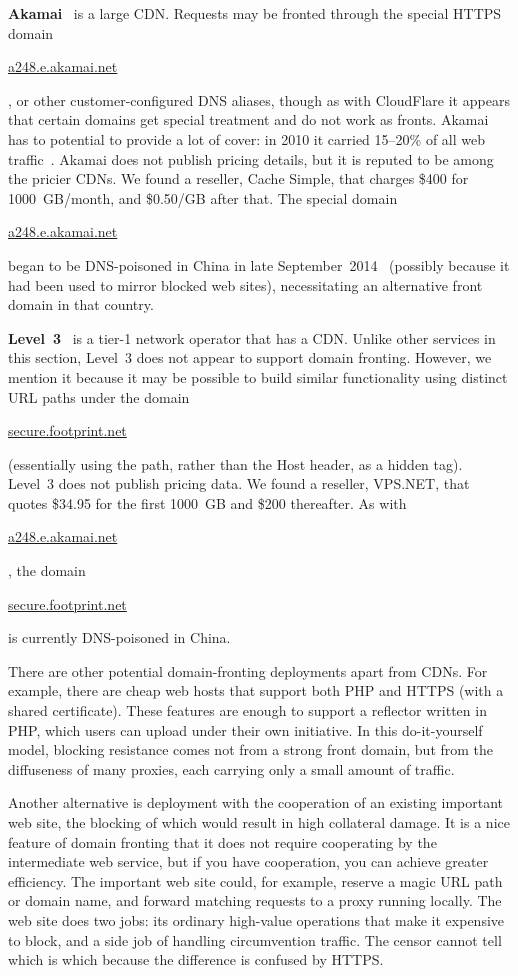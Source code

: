 \documentclass{sig-alternate}
\def\urll#1{\begin{NoHyper}\url{#1}\end{NoHyper}}
\begin{document}
\textbf{Akamai}~\cite{akamai-site} is a large CDN.
Requests may be fronted through the special HTTPS domain
\urll{a248.e.akamai.net},
or other customer-configured DNS aliases,
though as with CloudFlare it appears that certain domains
get special treatment and do not work as fronts.
Akamai has to potential to provide a lot of cover:
in 2010 it carried 15--20\% of all web traffic~\cite{akamai}.
Akamai does not publish pricing details,
but it is reputed to be among the pricier CDNs.
We found a reseller, Cache Simple,
that charges \$400 for 1000~GB/month, and \$0.50/GB after that.
The special domain
\urll{a248.e.akamai.net}
began to be DNS-poisoned in China in late September~2014~\cite{akamai-greatfire}
(possibly because it had been used to mirror blocked web sites),
necessitating an alternative front domain in that country.

\textbf{Level~3}~\cite{level3}
is a tier-1 network operator that has a CDN.
Unlike other services in this section,
Level~3 does not appear to support domain fronting.
However, we mention it because it may be possible to build similar functionality
using distinct URL paths under the domain \urll{secure.footprint.net}
(essentially using the path, rather than the Host header, as a hidden tag).
Level~3 does not publish pricing data.
We found a reseller, VPS.NET, that quotes
\$34.95 for the first 1000~GB and \$200 thereafter.
As with \urll{a248.e.akamai.net},
the domain \urll{secure.footprint.net} is
currently DNS-poisoned in China.


\smallskip

There are other potential domain-fronting deployments apart from CDNs.
For example, there are cheap web hosts that support both PHP and
HTTPS (with a shared certificate).
These features are enough to support a reflector written in PHP,
which users can upload under their own initiative.
In this do-it-yourself model, blocking resistance comes not from a strong front domain,
but from the diffuseness of many proxies, each carrying only a small amount of traffic.

Another alternative is deployment with the cooperation of an existing important web site,
the blocking of which would result in high collateral damage.
It is a nice feature of domain fronting that it does not require cooperating
by the intermediate web service,
but if you have cooperation, you can achieve greater efficiency.
The important web site could, for example, reserve a
magic URL path or domain name, and forward matching requests
to a proxy running locally.
The web site does two jobs:
its ordinary high-value operations that make it expensive to block,
and a side job of handling circumvention traffic.
The censor cannot tell which is which
because the difference is confused by HTTPS.
\end{document}
